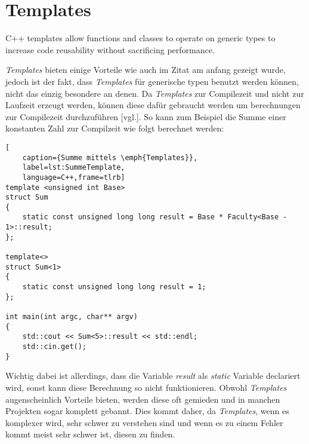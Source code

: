 \section{Templates}\label{sec:templates}
\begin{zitat}
    C++ templates allow functions and classes to operate on generic types to increase code
    reusability without sacrificing performance. \cite{TemplatesVorteil}
\end{zitat}
\emph{Templates} bieten einige Vorteile wie auch im Zitat am anfang gezeigt wurde, jedoch ist der
fakt, dass \emph{Templates} für generische typen benutzt werden können, nicht das einzig
besondere an denen.
\newline
\newline
Da \emph{Templates} zur Compilezeit und nicht zur Laufzeit erzeugt werden, können diese dafür
gebraucht werden um berechnungen zur Compilezeit durchzuführen \cite{HandsOn}[vgl.]. So kann zum
Beispiel die Summe einer konstanten Zahl zur Compilzeit wie folgt berechnet werden:
\begin{lstlisting}[
    caption={Summe mittels \emph{Templates}},
    label=lst:SummeTemplate,
    language=C++,frame=tlrb]
template <unsigned int Base>
struct Sum
{
	static const unsigned long long result = Base * Faculty<Base - 1>::result;
};

template<>
struct Sum<1>
{
	static const unsigned long long result = 1;
};

int main(int argc, char** argv)
{
	std::cout << Sum<5>::result << std::endl;
	std::cin.get();
}
\end{lstlisting}

Wichtig dabei ist allerdings, dass die Variable \emph{result} als \emph{static} Variable
declariert wird, sonst kann diese Berechnung so nicht funktionieren.
\newline
\newline
Obwohl \emph{Templates} augenscheinlich Vorteile bieten, werden diese oft gemieden und in manchen
Projekten sogar komplett gebannt. Dies kommt daher, da \emph{Templates}, wenn es komplexer wird,
sehr schwer zu verstehen sind und wenn es zu einem Fehler kommt meist sehr schwer ist, diesen zu
finden.